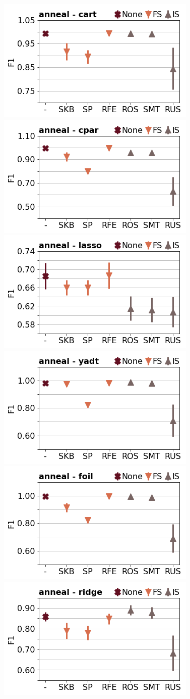 \documentclass[runningheads,a4paper]{llncs}
\begin{document}
\begin{figure}[!h]
\includegraphics[width=0.32\linewidth]{fig/preps_anneal_DT_sklearn_f1score.png}
\includegraphics[width=0.32\linewidth]{fig/preps_anneal_RB_cpar_f1score.png}
\includegraphics[width=0.32\linewidth]{fig/preps_anneal_LM_lasso_f1score.png}
\includegraphics[width=0.32\linewidth]{fig/preps_anneal_DT_yadt_f1score.png}
\includegraphics[width=0.32\linewidth]{fig/preps_anneal_RB_foil_f1score.png}
\includegraphics[width=0.32\linewidth]{fig/preps_anneal_LM_ridge_f1score.png}
\end{figure}
\end{document}
